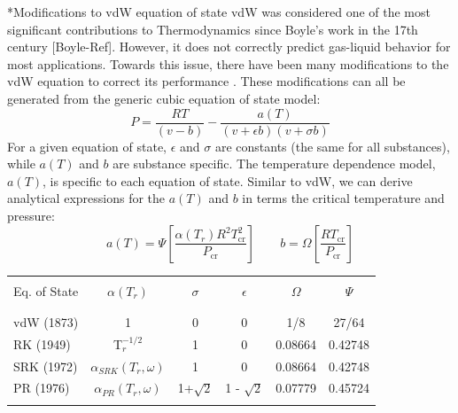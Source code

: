 \documentclass[11pt]{article}
\makeatletter
\theoremstyle{definition}
\renewcommand\subsection{\@startsection
	{subsection}{2}{0mm}
	{-0.05in}
	{0.5\baselineskip}
	{\normalfont\normalsize\bfseries}}
\makeatother
\begin{document}
\subsection*{Modifications to vdW equation of state}
vdW was considered one of the most significant contributions to Thermodynamics since Boyle's work in the 17th century [Boyle-Ref].
However, it does not correctly predict gas-liquid behavior for most applications.
Towards this issue, there have been many modifications to the vdW equation to correct its performance \cite{Valderrama2003}.
These modifications can all be generated from the generic cubic equation of state model:
\begin{equation}\label{eq:generic-model}
P = \frac{RT}{\left(v-b\right)}-\frac{a(T)}{\left(v+\epsilon b\right)\left(v+\sigma b\right)}
\end{equation}
For a given equation of state, $\epsilon$ and $\sigma$ are constants (the same for all substances), while
$a(T)$ and $b$ are substance specific. The temperature dependence model, $a(T)$, is specific to each equation of state.
Similar to vdW, we can derive analytical expressions for the $a(T)$ and $b$ in terms the critical temperature and pressure:
\begin{equation}
	a\left(T\right) = \Psi\left[\frac{\alpha\left(T_{r}\right)R^{2}T^{2}_{\mathrm{cr}}}{P_{\mathrm{cr}}}\right]\qquad
	b = \Omega\left[\frac{RT_{\mathrm{cr}}}{P_{\mathrm{cr}}}\right]
\end{equation}

\begin{center}
\begin{tabular}{lccccc}
	\hline\\
	Eq. of State & $\alpha\left(T_{r}\right)$ & $\sigma$ & $\epsilon$ & $\Omega$ & $\Psi$ \\\\
	\hline\\

	vdW (1873) & 1 & 0 & 0 & 1/8 & 27/64 \\
	RK (1949) & T$_{r}^{-1/2}$ & 1 & 0 & 0.08664 & 0.42748 \\
	SRK (1972) & $\alpha_{SRK}\left(T_{r},\omega\right)$ & 1 & 0 & 0.08664 & 0.42748 \\
	PR (1976) & $\alpha_{PR}\left(T_{r},\omega\right)$ & 1+$\sqrt{2}$ & 1 - $\sqrt{2}$ & 0.07779 & 0.45724 \\\\

	\hline

\end{tabular}
\end{center}
\end{document}
